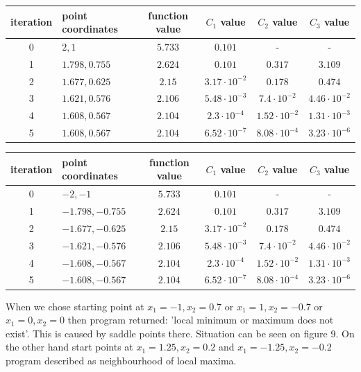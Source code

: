 \documentclass[12pt]{article}
\begin{document}
	\begin{table}[H]
		\begin{tabularx}{\textwidth}{c|X|c|c|c|c|}
			iteration & point coordinates & function value & $C_1$ value & $C_2$ value & $C_3$ value\\
			\hline
			0 & $2, 1$ & $5.733$ & $0.101$ & - & - \\
			\hline
			1 & $1.798, 0.755$ & $2.624$ & $0.101$ & $0.317$ & $3.109$ \\
			\hline
			2 & $1.677, 0.625$ & $2.15$ & $3.17\cdot10^{-2}$ & $0.178$ & $0.474$ \\
			\hline
			3 & $1.621, 0.576$ & $2.106$ & $5.48\cdot10^{-3}$ & $7.4\cdot10^{-2}$ & $4.46\cdot10^{-2}$ \\
			\hline
			4 & $1.608, 0.567$ & $2.104$ & $2.3\cdot10^{-4}$ & $1.52\cdot10^{-2}$ & $1.31\cdot10^{-3}$ \\
			\hline
			5 & $1.608, 0.567$ & $2.104$ & $6.52\cdot10^{-7}$ & $8.08\cdot10^{-4}$ & $3.23\cdot10^{-6}$ \\
			\hline					
 		\end{tabularx}	
	\end{table}

	\begin{table}[H]
		\begin{tabularx}{\textwidth}{c|X|c|c|c|c|}
			iteration & point coordinates & function value & $C_1$ value & $C_2$ value & $C_3$ value\\
			\hline
			0 & $-2, -1$ & $5.733$ & $0.101$ & - & - \\
			\hline
			1 & $-1.798, -0.755$ & $2.624$ & $0.101$ & $0.317$ & $3.109$ \\
			\hline
			2 & $-1.677, -0.625$ & $2.15$ & $3.17\cdot10^{-2}$ & $0.178$ & $0.474$ \\
			\hline
			3 & $-1.621, -0.576$ & $2.106$ & $5.48\cdot10^{-3}$ & $7.4\cdot10^{-2}$ & $4.46\cdot10^{-2}$ \\
			\hline
			4 & $-1.608, -0.567$ & $2.104$ & $2.3\cdot10^{-4}$ & $1.52\cdot10^{-2}$ & $1.31\cdot10^{-3}$ \\
			\hline
			5 & $-1.608, -0.567$ & $2.104$ & $6.52\cdot10^{-7}$ & $8.08\cdot10^{-4}$ & $3.23\cdot10^{-6}$ \\
			\hline	
		\end{tabularx}	
	\end{table}
When we chose starting point at $x_1=-1, x_2=0.7$ or $x_1=1, x_2=-0.7$ or $x_1=0, x_2=0$ then program returned: 'local minimum or maximum does not exist'. This is caused by saddle points there. Situation can be seen on figure 9. On the other hand start points at $x_1=1.25, x_2=0.2$ and $x_1=-1.25, x_2=-0.2$ program described as neighbourhood of local maxima.
	
\end{document}
